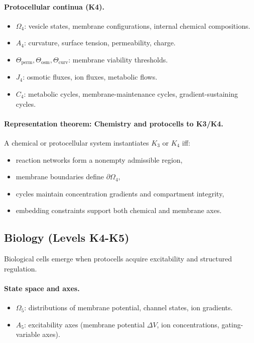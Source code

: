 \paragraph{Protocellular continua (K4).}
\begin{itemize}
  \item \(\Omega_{4}\): vesicle states, membrane configurations, internal
        chemical compositions.
  \item \(A_4\): curvature, surface tension, permeability, charge.
  \item \(\Theta_{\mathrm{perm}}, \Theta_{\mathrm{osm}}, \Theta_{\mathrm{curv}}\):
        membrane viability thresholds.
  \item \(J_4\): osmotic fluxes, ion fluxes, metabolic flows.
  \item \(C_4\): metabolic cycles, membrane-maintenance cycles,
        gradient-sustaining cycles.
\end{itemize}

\paragraph{Representation theorem: Chemistry and protocells to K3/K4.}
A chemical or protocellular system instantiates \(K_3\) or \(K_4\) iff:
\begin{itemize}
  \item reaction networks form a nonempty admissible region,
  \item membrane boundaries define \(\partial\Omega_4\),
  \item cycles maintain concentration gradients and compartment integrity,
  \item embedding constraints support both chemical and membrane axes.
\end{itemize}

\subsection{Biology (Levels K4-K5)}

Biological cells emerge when protocells acquire excitability and structured
regulation.

\paragraph{State space and axes.}
\begin{itemize}
  \item \(\Omega_5\): distributions of membrane potential, channel states,
        ion gradients.
  \item \(A_5\): excitability axes (membrane potential \(\Delta V\), ion
        concentrations, gating-variable axes).
\end{itemize}


